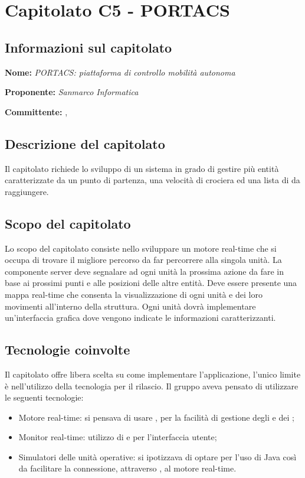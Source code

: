 \section{Capitolato C5 - PORTACS}\label{C5}
\subsection{Informazioni sul capitolato}
\begin{description}
	\item \textbf{Nome:} \textit{PORTACS: piattaforma di controllo mobilità autonoma}
	\item \textbf{Proponente:} \textit{Sanmarco Informatica}
	\item \textbf{Committente:} \VT{}, \CR{}
\end{description}

\subsection{Descrizione del capitolato}
Il capitolato richiede lo sviluppo di un sistema  in grado di gestire più entità caratterizzate da un punto di partenza, una velocità di crociera ed una lista di  da raggiungere.

\subsection{Scopo del capitolato}
Lo scopo del capitolato consiste nello sviluppare un motore real-time che si occupa di trovare il migliore percorso da far percorrere alla singola unità.
La componente server deve segnalare ad ogni unità la prossima azione da fare in base ai prossimi punti e alle posizioni delle altre entità. Deve essere presente una mappa real-time che consenta la visualizzazione di ogni unità e dei loro movimenti all'interno della struttura.
Ogni unità dovrà implementare un'interfaccia grafica dove vengono indicate le informazioni caratterizzanti.

\subsection{Tecnologie coinvolte}
Il capitolato offre libera scelta su come implementare l'applicazione, l'unico limite è nell'utilizzo della tecnologia  per il rilascio. Il gruppo aveva pensato di utilizzare le seguenti tecnologie:
\begin{itemize}
	\item Motore real-time: si pensava di usare , per la facilità di gestione degli  e dei ;
	\item Monitor real-time: utilizzo di  e  per l'interfaccia utente;
	\item Simulatori delle unità operative: si ipotizzava di optare per l'uso di Java così da facilitare la connessione, attraverso , al motore real-time.
\end{itemize}

